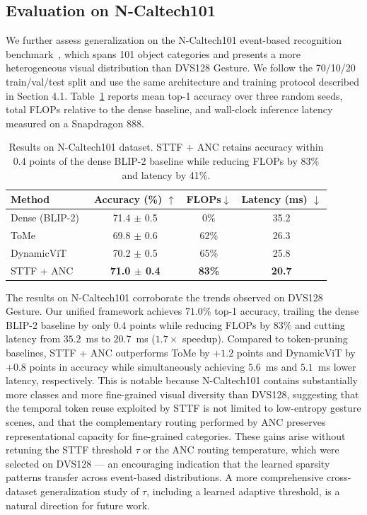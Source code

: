 \documentclass{article}
\begin{document}
\subsection{Evaluation on N-Caltech101}

We further assess generalization on the N-Caltech101 event-based recognition benchmark~\cite{orchard2015ncaltech}, which spans 101 object categories and presents a more heterogeneous visual distribution than DVS128 Gesture. We follow the 70/10/20 train/val/test split and use the same architecture and training protocol described in Section 4.1. Table~\ref{tab:ncaltech} reports mean top-1 accuracy over three random seeds, total FLOPs relative to the dense baseline, and wall-clock inference latency measured on a Snapdragon 888.

\begin{table}[htbp]
\centering
\caption{Results on N-Caltech101 dataset. STTF + ANC retains accuracy within 0.4 points of the dense BLIP-2 baseline while reducing FLOPs by 83\% and latency by 41\%.}
\label{tab:ncaltech}
\begin{tabular}{lccc}
\toprule
Method & Accuracy (\%) $\uparrow$ & FLOPs$\downarrow$ & Latency (ms) $\downarrow$ \\
\midrule
Dense (BLIP-2)~\cite{li2023blip2} & 71.4 $\pm$ 0.5 & 0\% & 35.2 \\
ToMe~\cite{bolya2023tome}           & 69.8 $\pm$ 0.6 & 62\% & 26.3 \\
DynamicViT~\cite{rao2021dynamicvit}     & 70.2 $\pm$ 0.5 & 65\% & 25.8 \\
\midrule
STTF + ANC     & \textbf{71.0 $\pm$ 0.4} & \textbf{83\%} & \textbf{20.7} \\
\bottomrule
\end{tabular}
\end{table}

The results on N-Caltech101 corroborate the trends observed on DVS128 Gesture. Our unified framework achieves $71.0\%$ top-1 accuracy, trailing the dense BLIP-2 baseline by only $0.4$ points while reducing FLOPs by $83\%$ and cutting latency from $35.2$~ms to $20.7$~ms ($1.7\times$ speedup). Compared to token-pruning baselines, STTF + ANC outperforms ToMe by $+1.2$ points and DynamicViT by $+0.8$ points in accuracy while simultaneously achieving $5.6$~ms and $5.1$~ms lower latency, respectively. This is notable because N-Caltech101 contains substantially more classes and more fine-grained visual diversity than DVS128, suggesting that the temporal token reuse exploited by STTF is not limited to low-entropy gesture scenes, and that the complementary routing performed by ANC preserves representational capacity for fine-grained categories. These gains arise without retuning the STTF threshold $\tau$ or the ANC routing temperature, which were selected on DVS128 — an encouraging indication that the learned sparsity patterns transfer across event-based distributions. A more comprehensive cross-dataset generalization study of $\tau$, including a learned adaptive threshold, is a natural direction for future work.
\end{document}
